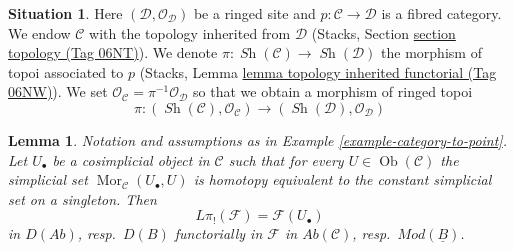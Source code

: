 \documentclass{amsart}
\theoremstyle{plain}
\newtheorem{lemma}[subsection]{Lemma}
\theoremstyle{definition}
\newtheorem{situation}[subsection]{Situation}
\theoremstyle{remark}
\numberwithin{equation}{subsection}
\def\Mor{\mathop{\mathrm{Mor}}\nolimits}
\def\Ob{\mathop{\mathrm{Ob}}\nolimits}
\def\Sh{\mathop{\mathit{Sh}}\nolimits}
\begin{document}
\begin{situation}
\label{situation-fibred-category}
Here $(\mathcal{D}, \mathcal{O}_\mathcal{D})$ be a ringed site
and $p : \mathcal{C} \to \mathcal{D}$ is a fibred category. We endow
$\mathcal{C}$ with the topology inherited from $\mathcal{D}$
(Stacks, Section \href{https://stacks.math.columbia.edu/tag/06NT}{section topology (Tag 06NT)}). We denote
$\pi : \Sh(\mathcal{C}) \to \Sh(\mathcal{D})$ the morphism of
topoi associated to $p$
(Stacks, Lemma \href{https://stacks.math.columbia.edu/tag/06NW}{lemma topology inherited functorial (Tag 06NW)}).
We set $\mathcal{O}_\mathcal{C} = \pi^{-1}\mathcal{O}_\mathcal{D}$
so that we obtain a morphism of ringed topoi
$$
\pi :
(\Sh(\mathcal{C}), \mathcal{O}_\mathcal{C})
\longrightarrow
(\Sh(\mathcal{D}), \mathcal{O}_\mathcal{D})
$$
\end{situation}

\begin{lemma}
\label{lemma-compute-by-cosimplicial-resolution}
Notation and assumptions as in Example \ref{example-category-to-point}.
Let $U_\bullet$ be a cosimplicial object in $\mathcal{C}$ such that
for every $U \in \Ob(\mathcal{C})$ the simplicial set
$\Mor_\mathcal{C}(U_\bullet, U)$
is homotopy equivalent to the constant simplicial set on a singleton. Then
$$
L\pi_!(\mathcal{F}) = \mathcal{F}(U_\bullet)
$$
in $D(\textit{Ab})$, resp.\ $D(B)$ functorially in $\mathcal{F}$ in
$\textit{Ab}(\mathcal{C})$, resp.\ $\textit{Mod}(\underline{B})$.
\end{lemma}
\end{document}
